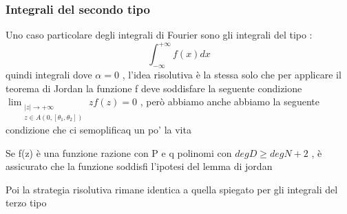 \documentclass{article}
\theoremstyle{definition}
\newcommand{\intinf}{\int_{-\infty}^{+\infty}}
\begin{document}
\subsubsection{Integrali del secondo tipo}
Uno caso particolare degli integrali di Fourier sono gli integrali del tipo : 
$$\intinf f(x)dx$$ quindi integrali dove $\alpha=0$ , l'idea risolutiva è la stessa solo che per applicare il teorema di Jordan la funzione f deve soddisfare la seguente condizione  $\lim_{\substack{|z| \to +\infty \\ z \in A(0, [\theta_1, \theta_2])}}zf(z)=0$ , però abbiamo anche abbiamo la seguente condizione che ci semoplificaq un po' la vita 
\begin{tcolorbox}
	Se f(z) è una funzione razione con P e q polinomi con $deg D \geq deg N+2$ , è assicurato che la funzione soddisfi l'ipotesi del lemma di jordan 
\end{tcolorbox}
Poi la strategia risolutiva rimane identica a quella spiegato per gli integrali del terzo tipo 
\newpage
\end{document}
